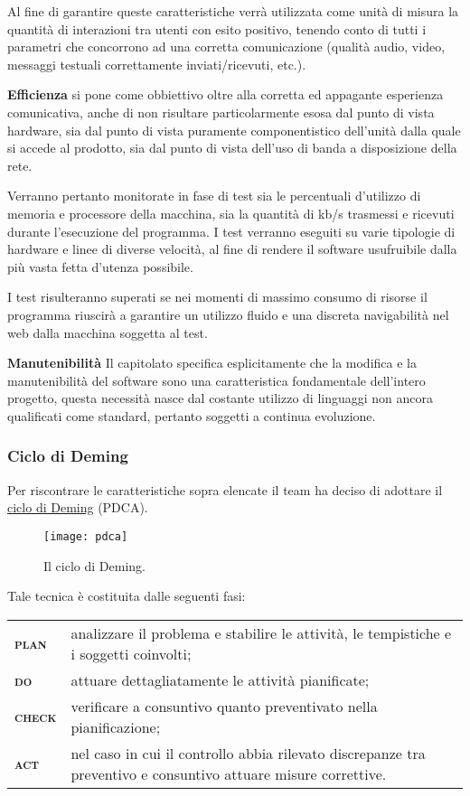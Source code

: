 \begin{description}
Al fine di garantire queste caratteristiche verrà utilizzata come unità di misura la quantità di interazioni tra utenti con esito positivo, tenendo conto di tutti i parametri che concorrono ad una corretta comunicazione (qualità audio, video, messaggi testuali correttamente inviati/ricevuti, etc.).

\item{\bfseries Efficienza}
\caName{} si pone come obbiettivo oltre alla corretta ed appagante esperienza comunicativa, anche di non risultare particolarmente esosa dal punto di vista hardware, sia dal punto di vista puramente componentistico dell'unità dalla quale si accede al prodotto, sia dal punto di vista dell'uso di banda a disposizione della rete.

Verranno pertanto monitorate in fase di test sia le percentuali d'utilizzo di memoria e processore della macchina, sia la quantità di kb/s trasmessi e ricevuti durante l'esecuzione del programma. I test verranno eseguiti su varie tipologie di hardware e linee di diverse velocità, al fine di rendere il software usufruibile dalla più vasta fetta d'utenza possibile.

I test risulteranno superati se nei momenti di massimo consumo di risorse il programma riuscirà a garantire un utilizzo fluido e una discreta navigabilità nel web dalla macchina soggetta al test. 

\item{\bfseries Manutenibilità}
Il capitolato specifica esplicitamente che la modifica e la manutenibilità del software sono una caratteristica fondamentale dell'intero progetto, questa necessità nasce dal costante utilizzo di linguaggi non ancora qualificati come standard, pertanto soggetti a continua evoluzione.
\end{description}

\subsubsection{Ciclo di Deming}
Per riscontrare le caratteristiche sopra elencate il team ha deciso di adottare il \underline{ciclo di Deming} (PDCA)\@.

\begin{figure}[h]
\centering
\texttt{[image: pdca]}
\caption{Il ciclo di Deming.}\label{fig:pdca}
\end{figure}

Tale tecnica è costituita dalle seguenti fasi:

\begin{tabularx}{.9\textwidth}{>{\bfseries\scshape}lX}
plan  & analizzare il problema e stabilire le attività, le tempistiche e i soggetti coinvolti;\\
do    & attuare dettagliatamente le attività pianificate;\\
check & verificare a consuntivo quanto preventivato nella pianificazione;\\
act   & nel caso in cui il controllo abbia rilevato discrepanze tra preventivo e consuntivo attuare misure correttive.\\
\end{tabularx}

